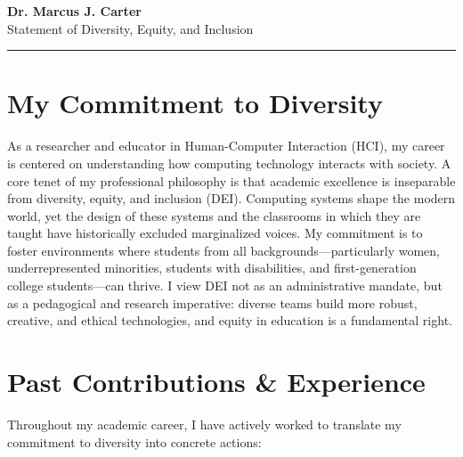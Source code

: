 \documentclass[11pt,letterpaper]{article}
\begin{document}
\begin{center}
    {\sffamily\Huge\bfseries\color{accent} Dr. Marcus J. Carter} \\
    \vspace{0.4em}
    {\sffamily\Large\color{textdark!80} Statement of Diversity, Equity, and Inclusion} \\
    \vspace{0.6em}
    {\color{divider}\rule{0.3\linewidth}{1.2pt}}
\end{center}
\vspace{1.5em}

\section{My Commitment to Diversity}

As a researcher and educator in Human-Computer Interaction (HCI), my career is centered on understanding how computing technology interacts with society. A core tenet of my professional philosophy is that academic excellence is inseparable from diversity, equity, and inclusion (DEI). Computing systems shape the modern world, yet the design of these systems and the classrooms in which they are taught have historically excluded marginalized voices. My commitment is to foster environments where students from all backgrounds---particularly women, underrepresented minorities, students with disabilities, and first-generation college students---can thrive. I view DEI not as an administrative mandate, but as a pedagogical and research imperative: diverse teams build more robust, creative, and ethical technologies, and equity in education is a fundamental right.

\section{Past Contributions \& Experience}

Throughout my academic career, I have actively worked to translate my commitment to diversity into concrete actions:
\end{document}
